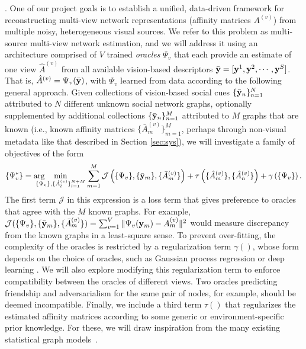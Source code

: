 . One of our project goals is to establish a unified, data-driven framework for reconstructing multi-view network representations (affinity matrices $A^{(v)}$) from multiple noisy, heterogeneous visual sources. We refer to this problem as multi-source multi-view network estimation, and we will address it using an architecture  comprised of $V$ trained \emph{oracles} $\Psi_{v}$ that each provide an estimate of one view $\hat{A}^{(v)}$ from all available vision-based descriptors $\bar{{\bf y}}=[{\bf y}^1,{\bf y}^2, \cdots,{\bf y}^S]$. That is, $\hat{A}^{(v)}=\Psi_{v}(\bar{{\bf y}})$, with $\Psi_{v}$ learned from data according to the following general approach. Given collections of vision-based social cues $\{\bar{{\bf y}}_{n}\}_{n=1}^{N}$ attributed to $N$ different unknown social network graphs, optionally supplemented by additional collections $\{\bar{{\bf y}}_{n}\}_{n=1}^{M}$ attributed to $M$ graphs that are known (i.e., known 
affinity matrices $\{\bar{A}^{(v)}_{m}\}_{m=1}^{M}$, perhaps through non-visual metadata like that described in Section \ref{sec:sys}), we will investigate a family of objectives of the form
\begin{equation}\label{eq:sensing}
\{\Psi^{*}_{v}\}=\arg\!\!\!\!\!\!\!\!\min_{\{\Psi_{v}\},\{\hat{A}^{(v)}_l\}_{l=1}^{N+M}}\sum_{m=1}^{M}\mathcal{J}\left(\{\Psi_{v}\}, \{\bar{\vy}_m\}, \{\bar{A}^{(v)}_m\}\right)+\tau\left(\{\hat{A}^{(v)}_m\},\{\hat{A}^{(v)}_n\}\right)+\gamma\left(\{\Psi_{v}\}\right).
 \end{equation}
The first term $\mathcal{J}$ in this expression is a loss term that gives preference to oracles that agree with the $M$ known graphs. For example,  $\mathcal{J}(\{\Psi_{v}\}, \{\bar{{\bf y}}_m\}, \{\bar{A}^{(v)}_m\})=\sum_{v=1}^{V}\|\Psi_{v}({\bf y}_m)-A^{(v)}_m\|^{2}$ would measure discrepancy from the known graphs in a least-square sense. To prevent over-fitting, the complexity of the oracles is restricted by a regularization term $\gamma()$, whose form depends on the choice of oracles, such as Gaussian process regression \cite{GPbook} or deep learning \cite{DLbook}. We will also explore modifying this regularization term to enforce compatibility between the oracles of different views. Two oracles predicting friendship and adversarialism for the same pair of nodes, for example, should be deemed incompatible. Finally, we include a third term $\tau()$ that regularizes the estimated affinity matrices according to some generic or environment-specific prior knowledge. For these, we will draw inspiration from the many existing statistical graph models~\cite{Goldenberg}.

